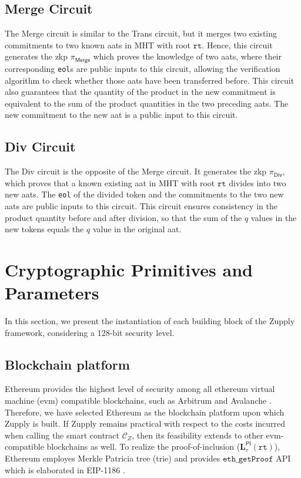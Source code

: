 \subsection{\textsf{Merge} Circuit} 
The \textsf{Merge} circuit is similar to the \textsf{Trans} circuit, but it merges two existing commitments to two known \gls{aat}s in \textsf{MHT} with root $\texttt{rt}$. Hence, this circuit generates the \gls{zkp} $\pi_\textsf{Merge}$ which proves the knowledge of two \gls{aat}s, where their corresponding \texttt{eol}s are public inputs to this circuit, allowing the verification algorithm to check whether those \gls{aat}s have been transferred before. This circuit also guarantees that the quantity of the product in the new commitment is equivalent to the sum of the product quantities in the two preceding \gls{aat}s. The new commitment to the new \gls{aat} is a public input to this circuit.


\subsection{\textsf{Div} Circuit} 
The \textsf{Div} circuit is the opposite of the \textsf{Merge} circuit. It generates the \gls{zkp} $\pi_\textsf{Div}$, which proves that a known existing \gls{aat} in \textsf{MHT} with root $\texttt{rt}$ divides into two new \gls{aat}s. The \texttt{eol} of the divided token and the commitments to the two new \gls{aat}s are public inputs to this circuit. This circuit ensures consistency in the product quantity before and after division, so that the sum of the $q$ values in the new tokens equals the $q$ value in the original \gls{aat}.


\section{Cryptographic Primitives and Parameters}
In this section, we present the instantiation of each building block  of the Zupply framework, considering a 128-bit security level. 

\subsection{Blockchain platform }
Ethereum provides the highest level of security among all ethereum virtual machine (\gls{evm}) compatible blockchains, such as Arbitrum and Avalanche \cite{Neiheiser2023PracticalLimitations, Kalodner2018Arbitrum, Avalanche}. Therefore, we have selected Ethereum as the blockchain platform upon which Zupply is built. If Zupply remains practical with respect to the costs incurred when calling the smart contract $\mathcal{C}_Z$, then its feasibility extends to other \gls{evm}-compatible blockchains as well. To realize the proof-of-inclusion ($\mathbf{L}_\tau^\mathsf{PI}(\texttt{rt})$), Ethereum employes Merkle Patricia tree (trie) \cite{PatriciaTree, ethereum} and provides $\texttt{eth\_getProof}$ API which is elaborated in EIP-1186 \cite{Jentzsch2018}. 


